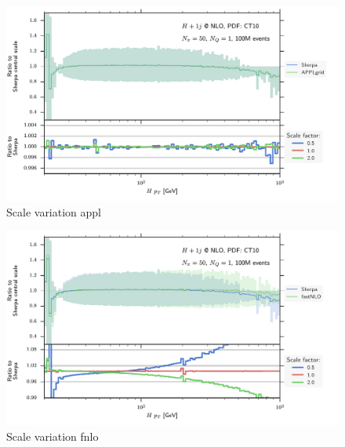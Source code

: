 %
\begin{figure}
	\centering
	\includegraphics[width=\textwidth]{images/scalesvar_hjnlo_appl.pdf}
	\caption{Scale variation appl}
	\label{fig:scalesvar_hjnlo_appl}
\end{figure}
%
\begin{figure}
	\centering
	\includegraphics[width=\textwidth]{images/scalesvar_hjnlo_fnlo.pdf}
	\caption{Scale variation fnlo}
	\label{fig:scalesvar_hjnlo_fnlo}
\end{figure}
%

